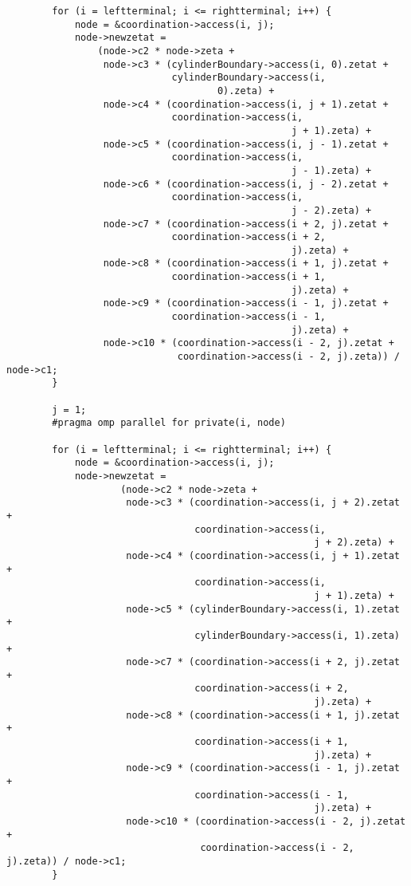 \documentclass[12pt]{article}
\begin{document}
\begin{itemize}
\begin{lstlisting}
        for (i = leftterminal; i <= rightterminal; i++) {
            node = &coordination->access(i, j);
            node->newzetat =
                (node->c2 * node->zeta +
                 node->c3 * (cylinderBoundary->access(i, 0).zetat +
                             cylinderBoundary->access(i,
                                     0).zeta) +
                 node->c4 * (coordination->access(i, j + 1).zetat +
                             coordination->access(i,
                                                  j + 1).zeta) +
                 node->c5 * (coordination->access(i, j - 1).zetat +
                             coordination->access(i,
                                                  j - 1).zeta) +
                 node->c6 * (coordination->access(i, j - 2).zetat +
                             coordination->access(i,
                                                  j - 2).zeta) +
                 node->c7 * (coordination->access(i + 2, j).zetat +
                             coordination->access(i + 2,
                                                  j).zeta) +
                 node->c8 * (coordination->access(i + 1, j).zetat +
                             coordination->access(i + 1,
                                                  j).zeta) +
                 node->c9 * (coordination->access(i - 1, j).zetat +
                             coordination->access(i - 1,
                                                  j).zeta) +
                 node->c10 * (coordination->access(i - 2, j).zetat +
                              coordination->access(i - 2, j).zeta)) / node->c1;
        }

        j = 1;
        #pragma omp parallel for private(i, node)

        for (i = leftterminal; i <= rightterminal; i++) {
            node = &coordination->access(i, j);
            node->newzetat =
                    (node->c2 * node->zeta +
                     node->c3 * (coordination->access(i, j + 2).zetat +
                                 coordination->access(i,
                                                      j + 2).zeta) +
                     node->c4 * (coordination->access(i, j + 1).zetat +
                                 coordination->access(i,
                                                      j + 1).zeta) +
                     node->c5 * (cylinderBoundary->access(i, 1).zetat +
                                 cylinderBoundary->access(i, 1).zeta) +
                     node->c7 * (coordination->access(i + 2, j).zetat +
                                 coordination->access(i + 2,
                                                      j).zeta) +
                     node->c8 * (coordination->access(i + 1, j).zetat +
                                 coordination->access(i + 1,
                                                      j).zeta) +
                     node->c9 * (coordination->access(i - 1, j).zetat +
                                 coordination->access(i - 1,
                                                      j).zeta) +
                     node->c10 * (coordination->access(i - 2, j).zetat +
                                  coordination->access(i - 2, j).zeta)) / node->c1;
        }


\end{lstlisting}
\end{itemize}
\end{document}
